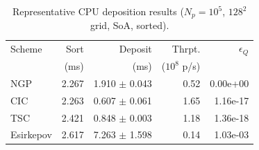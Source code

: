 \begin{table}[t]
\centering
\small
\caption{Representative CPU deposition results ($N_p=10^5$, $128^2$ grid, SoA, sorted).}
\label{tab:summary}
\begin{tabular}{lrrrr}
\toprule
Scheme & Sort & Deposit & Thrpt. & $\epsilon_Q$ \\
 & (ms) & (ms) & ($10^8$ p/s) & \\
\midrule
NGP & 2.267 & 1.910 $\pm$ 0.043 & 0.52 & 0.00e+00 \\
CIC & 2.263 & 0.607 $\pm$ 0.061 & 1.65 & 1.16e-17 \\
TSC & 2.421 & 0.848 $\pm$ 0.003 & 1.18 & 1.36e-18 \\
Esirkepov & 2.617 & 7.263 $\pm$ 1.598 & 0.14 & 1.03e-03 \\
\bottomrule
\end{tabular}
\end{table}
